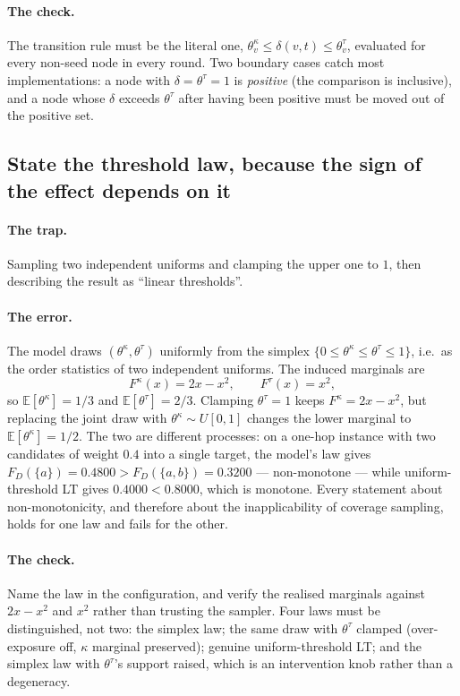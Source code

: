 \paragraph{The check.} The transition rule must be the literal one,
$\theta^\kappa_v \le \delta(v,t) \le \theta^\tau_v$, evaluated for every non-seed node in every round.
Two boundary cases catch most implementations: a node with $\delta = \theta^\tau = 1$ is
\emph{positive} (the comparison is inclusive), and a node whose $\delta$ exceeds $\theta^\tau$ after
having been positive must be moved out of the positive set.

\subsection{State the threshold law, because the sign of the effect depends on it}

\paragraph{The trap.} Sampling two independent uniforms and clamping the upper one to $1$, then
describing the result as ``linear thresholds''.

\paragraph{The error.} The model draws $(\theta^\kappa, \theta^\tau)$ uniformly from the simplex
$\{0 \le \theta^\kappa \le \theta^\tau \le 1\}$, i.e.\ as the order statistics of two independent
uniforms. The induced marginals are
\[
  F^\kappa(x) = 2x - x^2, \qquad F^\tau(x) = x^2,
\]
so $\mathbb{E}[\theta^\kappa] = 1/3$ and $\mathbb{E}[\theta^\tau] = 2/3$. Clamping
$\theta^\tau = 1$ keeps $F^\kappa = 2x - x^2$, but replacing the joint draw with
$\theta^\kappa \sim U[0,1]$ changes the lower marginal to $\mathbb{E}[\theta^\kappa] = 1/2$. The two
are different processes: on a one-hop instance with two candidates of weight $0.4$ into a single
target, the model's law gives $F_D(\{a\}) = 0.4800 > F_D(\{a,b\}) = 0.3200$ --- non-monotone ---
while uniform-threshold LT gives $0.4000 < 0.8000$, which is monotone. Every statement about
non-monotonicity, and therefore about the inapplicability of coverage sampling, holds for one law
and fails for the other.

\paragraph{The check.} Name the law in the configuration, and verify the realised marginals against
$2x - x^2$ and $x^2$ rather than trusting the sampler. Four laws must be distinguished, not two:
the simplex law; the same draw with $\theta^\tau$ clamped (over-exposure off, $\kappa$ marginal
preserved); genuine uniform-threshold LT; and the simplex law with $\theta^\tau$'s support raised,
which is an intervention knob rather than a degeneracy.

